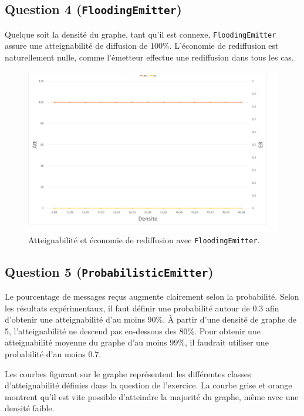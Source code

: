 \documentclass[a4paper]{article}
\begin{document}
\subsection{Question 4 (\texttt{FloodingEmitter})}
Quelque soit la densité du graphe, tant qu'il est connexe,
\texttt{FloodingEmitter} assure une atteignabilité de diffusion de
100\%. L'économie de rediffusion est naturellement nulle, comme
l'émetteur effectue une rediffusion dans tous les cas.
\begin{figure}[H]
\begin{minipage}{\textwidth}
  \centering
    \includegraphics[width=\textwidth]{images/ex2q4.png}
    \caption{Atteignabilité et économie de rediffusion avec \texttt{FloodingEmitter}.}
\end{minipage}
\end{figure}

\subsection{Question 5 (\texttt{ProbabilisticEmitter})}

Le pourcentage de messages reçus augmente clairement selon la
probabilité. Selon les résultats expérimentaux, il faut définir une probabilité autour
de 0.3 afin d'obtenir une atteignabilité d'au moins 90\%. À partir
d'une densité de graphe de 5, l'atteignabilité ne descend pas
en-dessous des 80\%. Pour obtenir une atteignabilité moyenne du graphe
d'au moins 99\%, il faudrait utiliser une probabilité d'au moins 0.7.

Les courbes figurant sur le graphe représentent les différentes
classes d'atteignabilité définies dans la question de l'exercice. La
courbe grise et orange montrent qu'il est vite possible d'atteindre la
majorité du graphe, même avec une densité faible.
\end{document}
